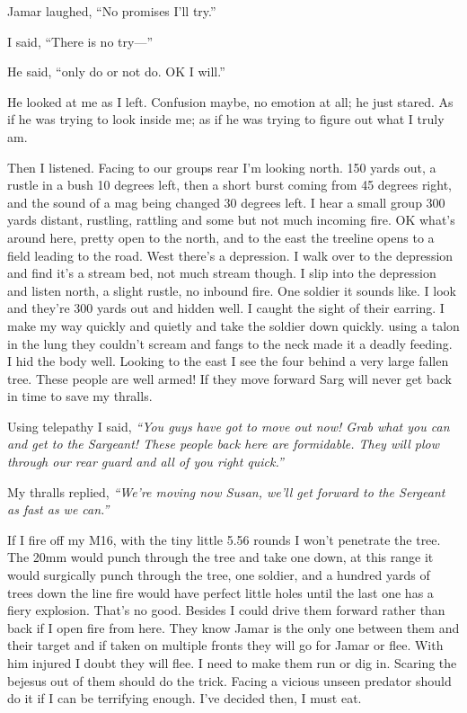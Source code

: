 Jamar laughed, ``No promises I'll try.''

I said, ``There is no try---''

He said, ``only do or not do. OK I will.''

He looked at me as I left. Confusion maybe, no emotion at all; he just stared. As if he was trying to look inside me; as if he was trying to figure out what I truly am.

Then I listened. Facing to our groups rear I'm looking north. 150 yards out, a rustle in a bush 10 degrees left, then a short burst coming from 45 degrees right, and the sound of a mag being changed 30 degrees left. I hear a small group 300 yards distant, rustling, rattling and some but not much incoming fire. OK what's around here, pretty open to the north, and to the east the treeline opens to a field leading to the road. West there's a depression. I walk over to the depression and find it's a stream bed, not much stream though. I slip into the depression and listen north, a slight rustle, no inbound fire. One soldier it sounds like. I look and they're 300 yards out and hidden well. I caught the sight of their earring. I make my way quickly and quietly and take the soldier down quickly. using a talon in the lung they couldn't scream and fangs to the neck made it a deadly feeding. I hid the body well. Looking to the east I see the four behind a very large fallen tree. These people are well armed! If they move forward Sarg will never get back in time to save my thralls.

Using telepathy I said, \textit{``You guys have got to move out now! Grab what you can and get to the Sargeant! These people back here are formidable. They will plow through our rear guard and all of you right quick.''}

My thralls replied, \textit{``We're moving now Susan, we'll get forward to the Sergeant as fast as we can.''}

If I fire off my M16, with the tiny little 5.56 rounds I won't penetrate the tree. The 20mm would punch through the tree and take one down, at this range it would surgically punch through the tree, one soldier, and a hundred yards of trees down the line fire would have perfect little holes until the last one has a fiery explosion. That's no good. Besides I could drive them forward rather than back if I open fire from here. They know Jamar is the only one between them and their target and if taken on multiple fronts they will go for Jamar or flee. With him injured I doubt they will flee. I need to make them run or dig in. Scaring the bejesus out of them should do the trick. Facing a vicious unseen predator should do it if I can be terrifying enough. I've decided then, I must eat.

